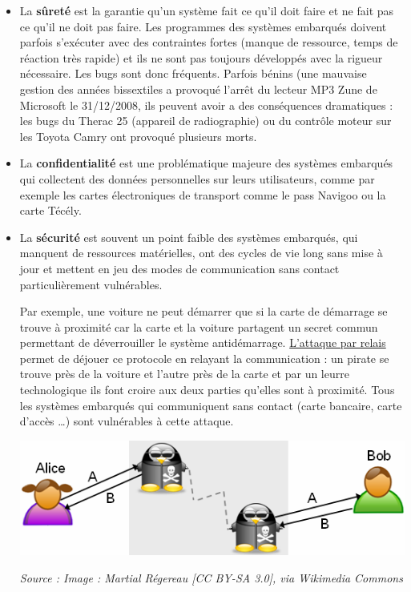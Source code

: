 \begin{itemize}[label=]

	\item La \textbf{sûreté} est la garantie qu'un système fait ce qu'il doit faire et ne fait pas ce qu'il ne doit pas faire. Les programmes des systèmes embarqués doivent parfois s'exécuter avec des contraintes fortes (manque de ressource, temps de réaction très rapide) et  ils ne sont pas toujours développés avec la rigueur nécessaire. Les bugs sont donc fréquents. Parfois bénins (une mauvaise gestion des années bissextiles a provoqué l'arrêt  du lecteur MP3 Zune de Microsoft le 31/12/2008, ils peuvent avoir  a des conséquences  dramatiques : les bugs  du Therac 25 (appareil de radiographie) ou du contrôle moteur sur les Toyota Camry ont provoqué plusieurs morts.
	
	\item La \textbf{confidentialité} est une problématique majeure des systèmes embarqués qui collectent des données personnelles sur leurs utilisateurs, comme par exemple les cartes électroniques de transport comme le pass Navigoo ou la carte Técély.
	
	\item La \textbf{sécurité}  est souvent un point faible des systèmes embarqués, qui manquent de ressources matérielles, ont des cycles de vie long sans mise à jour et mettent en jeu des modes de communication sans contact particulièrement vulnérables. 
	
Par exemple, une voiture ne peut démarrer que si la carte de démarrage se trouve à proximité car la carte et la voiture partagent un secret commun permettant de déverrouiller le système antidémarrage. \href{https://interstices.info/la-securite-des-systemes-informatiques-ubiquitaires/}{L'attaque par relais} permet  de déjouer ce  protocole  en relayant la communication : un pirate se trouve près de la voiture et l'autre près de la carte et par un leurre technologique ils font croire aux deux parties qu'elles sont à proximité.  Tous les systèmes embarqués qui communiquent sans contact (carte bancaire, carte d'accès \ldots) sont vulnérables à cette attaque.
	
\begin{center}
\includegraphics[scale=0.5]{Attaque_par_relais.png}

{\itshape \small Source : Image : Martial Régereau [CC BY-SA 3.0], via Wikimedia Commons}
\end{center}
	
\end{itemize}



